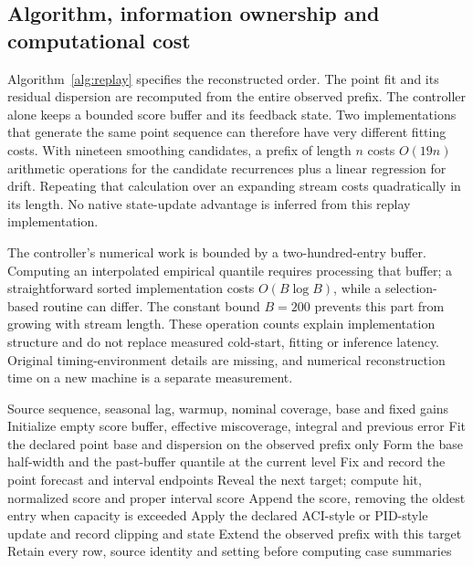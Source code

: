 \subsection{Algorithm, information ownership and computational cost}
Algorithm~\ref{alg:replay} specifies the reconstructed order. The point fit and its residual dispersion are recomputed from the entire observed prefix. The controller alone keeps a bounded score buffer and its feedback state. Two implementations that generate the same point sequence can therefore have very different fitting costs. With nineteen smoothing candidates, a prefix of length $n$ costs $O(19n)$ arithmetic operations for the candidate recurrences plus a linear regression for drift. Repeating that calculation over an expanding stream costs quadratically in its length. No native state-update advantage is inferred from this replay implementation.

The controller's numerical work is bounded by a two-hundred-entry buffer. Computing an interpolated empirical quantile requires processing that buffer; a straightforward sorted implementation costs $O(B\log B)$, while a selection-based routine can differ. The constant bound $B=200$ prevents this part from growing with stream length. These operation counts explain implementation structure and do not replace measured cold-start, fitting or inference latency. Original timing-environment details are missing, and numerical reconstruction time on a new machine is a separate measurement.

\begin{algorithm}[htbp]
\caption{Reconstruct one adaptive interval stream while keeping its target outside the prediction and score-buffer quantile until the observation step.}
\label{alg:replay}
\begin{algorithmic}[1]
\Require Source sequence, seasonal lag, warmup, nominal coverage, base and fixed gains
\State Initialize empty score buffer, effective miscoverage, integral and previous error
  \State Fit the declared point base and dispersion on the observed prefix only
  \State Form the base half-width and the past-buffer quantile at the current level
  \State Fix and record the point forecast and interval endpoints
  \State Reveal the next target; compute hit, normalized score and proper interval score
  \State Append the score, removing the oldest entry when capacity is exceeded
  \State Apply the declared ACI-style or PID-style update and record clipping and state
  \State Extend the observed prefix with this target
\EndFor
\State Retain every row, source identity and setting before computing case summaries
\end{algorithmic}
\end{algorithm}

